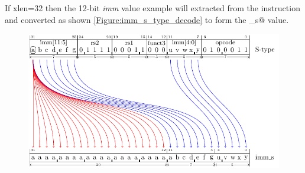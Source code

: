 If \Gls{xlen}=32 then the 12-bit {\em imm} value example will extracted
from the instruction and converted as shown \autoref{Figure:imm_s_type_decode}
to form the \verb@imm_s@ value.

\begin{figure}[ht]
  \centering
  \includegraphics{figures/chapter05/STypeDecode.pdf}
  \label{Figure:imm_s_type_decode}
  \label{imm.s:decode}
\end{figure}

